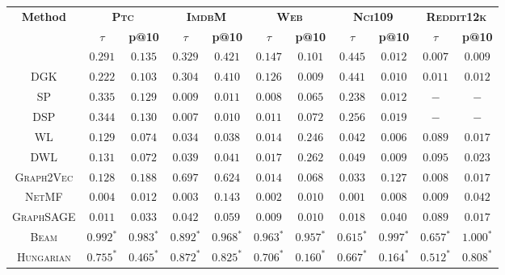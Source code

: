 \documentclass{article}
\newcommand{\netmf}{\textsc{NetMF}\xspace}
\newcommand{\graphsage}{\textsc{GraphSAGE}\xspace}
\newcommand{\gv}{\textsc{Graph2Vec}\xspace}
\newcommand{\beam}{\textsc{Beam}\xspace}
\newcommand{\hungarian}{\textsc{Hungarian}\xspace}
\newcommand{\ptc}{\textsc{Ptc}\xspace}
\newcommand{\imdb}{\textsc{ImdbM}\xspace}
\newcommand{\web}{\textsc{Web}\xspace}
\newcommand{\nci}{\textsc{Nci109}\xspace}
\newcommand{\reddit}{\textsc{Reddit12k}\xspace}
\begin{document}
\begin{table*}
\centering
\vspace{-0.05in}
  \begin{tabular}{ccccccccccc}
    \toprule
    \multirow{3}{*}{\textbf{Method}} &
      \multicolumn{2}{c}{\textbf{\ptc}} &
      \multicolumn{2}{c}{\textbf{\imdb}} &
      \multicolumn{2}{c}{\textbf{\web}} &
      \multicolumn{2}{c}{\textbf{\nci}} &
      \multicolumn{2}{c}{\textbf{\reddit}} \\
      & \textbf{$\tau$} & \textbf{p@10} & \textbf{$\tau$} & \textbf{p@10} & \textbf{$\tau$} & \textbf{p@10} & \textbf{$\tau$} & \textbf{p@10} & \textbf{$\tau$} & \textbf{p@10} \\
      \midrule

      


    \textsc{GK} & $0.291$ & $0.135$ & $0.329$ & $0.421$ & $0.147$ & $0.101$ & $0.445$ & $0.012$ & $0.007$ & $0.009$ \\
    \textsc{DGK} & $0.222$ & $0.103$ & $0.304$ & $0.410$ & $0.126$ & $0.009$ & $0.441$ & $0.010$ & $0.011$ & $0.012$ \\ 
    \textsc{SP} & $0.335$ & $0.129$ & $0.009$ & $0.011$ & $0.008$ & $0.065$ & $0.238$ & $0.012$ & $-$ & $-$ \\
    \textsc{DSP} & $0.344$ & $0.130$ & $0.007$ & $0.010$ & $0.011$ & $0.072$ & $0.256$ & $0.019$ & $-$ & $-$ \\
    \textsc{WL} & $0.129$ & $0.074$ & $0.034$ & $0.038$ & $0.014$ & $0.246$ & $0.042$ & $0.006$ & $0.089$ & $0.017$ \\ 
    \textsc{DWL} & $0.131$ & $0.072$ & $0.039$ & $0.041$ & $0.017$ & $0.262$ & $0.049$ & $0.009$ & $0.095$ & $0.023$ \\ \hline
    \gv & $0.128$ & $0.188$ & $0.697$ & $0.624$ & $0.014$ & $0.068$ & $0.033$ & $0.127$ & $0.008$ & $0.017$ \\
    \netmf & $0.004$ & $0.012$ & $0.003$ & $0.143$ & $0.002$ & $0.010$ & $0.001$ & $0.008$ & $0.009$ & $0.042$ \\
    \graphsage & $0.011$ & $0.033$ & $0.042$ & $0.059$ & $0.009$ & $0.010$ & $0.018$ & $0.040$ & $0.089$ & $0.017$ \\
\hline
    \beam & $0.992^{*}$ & $0.983^{*}$ & $0.892^{*}$ & $0.968^{*}$ & $0.963^{*}$ & $0.957^{*}$ & $0.615^{*}$ & $0.997^{*}$ & $0.657^{*}$ & $1.000^{*}$ \\
    \hungarian & $0.755^{*}$ & $0.465^{*}$ & $0.872^{*}$ & $0.825^{*}$ & $0.706^{*}$ & $0.160^{*}$ & $0.667^{*}$ & $0.164^{*}$ & $0.512^{*}$ & $0.808^{*}$ \\

\end{tabular}
\end{table*}
\end{document}
